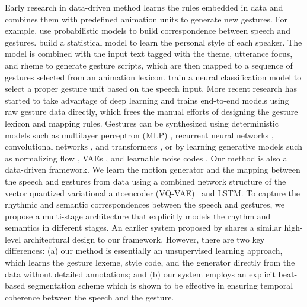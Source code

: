 Early research in data-driven method learns the rules embedded in data and combines them with predefined animation units to generate new gestures. For example, \citet{kopp2006towards, levine2010gesture} use probabilistic models to build correspondence between speech and gestures. \citet{Neff2008Gesture} build a statistical model to learn the personal style of each speaker. The model is combined with the input text tagged with the theme, utterance focus, and rheme to generate gesture scripts, which are then mapped to a sequence of gestures selected from an animation lexicon. \citet{chiu2015predicting} train a neural classification model to select a proper gesture unit based on the speech input. More recent research has started to take advantage of deep learning and trains  end-to-end models using raw gesture data directly, which frees the manual efforts of designing the gesture lexicon and mapping rules. Gestures can be synthesized using deterministic models such as multilayer perceptron (MLP) \cite{kucherenko2020gesticulator}, recurrent neural networks \cite{hasegawa2018evaluation, yoon2019robots, yoon2020speech, bhattacharya2021speech2affectivegestures, liu2022learning}, convolutional networks \cite{habibie2021learning}, and transformers \cite{9417647}, or by learning generative models such as normalizing flow \cite{alexanderson2020style}, VAEs \cite{li2021audio2gestures, xu2022freeform}, and learnable noise codes \cite{qian2021speech}. Our method is also a data-driven framework. We learn the motion generator and the mapping between the speech and gestures from data using a combined network structure of the vector quantized variational autoencoder (VQ-VAE)~\cite{oord2017neural} and LSTM. To capture the rhythmic and semantic correspondences between the speech and gestures, we propose a multi-stage architecture that explicitly models the rhythm and semantics in different stages. An earlier system proposed by \citet{kucherenko2021speech2properties2gestures} shares a similar high-level architectural design to our framework. However, there are two key differences: (a) our method is essentially an unsupervised learning approach, which learns the gesture lexeme, style code, and the generator directly from the data without detailed annotations; and (b) our system employs an explicit beat-based segmentation scheme which is shown to be effective in ensuring temporal coherence between the speech and the gesture.

